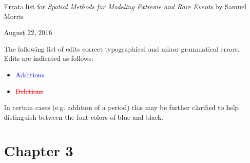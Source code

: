 \documentclass[11pt]{article}
\begin{document}
\begin{center}
Errata list for \emph{Spatial Methods for Modeling Extreme and Rare Events} by Samuel Morris

August 22, 2016
\end{center}

The following list of edits correct typographical and minor grammatical errors. Edits are indicated as follows:
\begin{itemize}
  \item \textcolor{blue}{Additions}
  \item \textcolor{red}{\st{Deletions}}
\end{itemize}
In certain cases (e.g. addition of a period) this may be further clarified to help distinguish between the font colors of blue and black.

\section*{Chapter 3}
\end{document}
